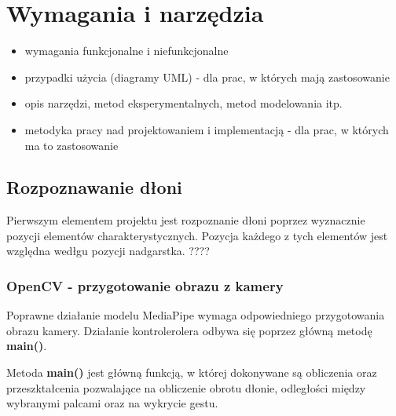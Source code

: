 
\chapter{Wymagania i narzędzia}

\begin{itemize}
\item wymagania funkcjonalne i niefunkcjonalne
\item przypadki użycia (diagramy UML) - dla prac, w których mają zastosowanie
\item opis narzędzi, metod eksperymentalnych, metod modelowania itp.
\item metodyka pracy nad projektowaniem i implementacją - dla prac, w których ma to zastosowanie
\end{itemize}

\section{Rozpoznawanie dłoni}

\quad Pierwszym elementem projektu jest rozpoznanie dłoni poprzez wyznacznie pozycji elementów charakterystycznych. Pozycja każdego z tych elementów jest względna wedłgu pozycji nadgarstka. ????


\subsection{OpenCV - przygotowanie obrazu z kamery}

\quad Poprawne działanie modelu MediaPipe wymaga odpowiedniego przygotowania obrazu kamery. Działanie kontrolerolera odbywa się poprzez główną metodę \textbf{main()}.

Metoda \textbf{main()} jest główną funkcją, w której dokonywane są obliczenia oraz przeszktałcenia pozwalające na obliczenie obrotu dłonie, odległości między wybranymi palcami oraz na wykrycie gestu. 




